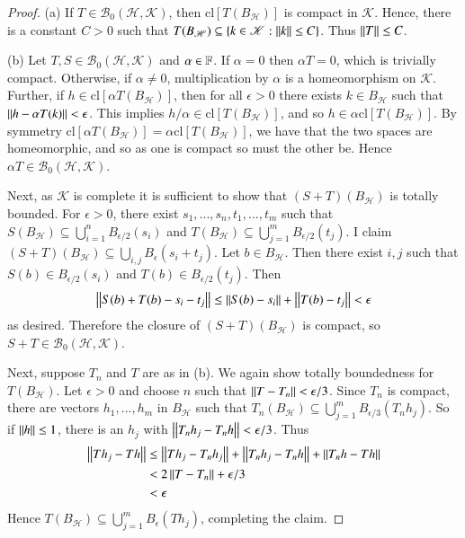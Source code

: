 \begin{proof}
    (a) If $T \in \mathscr{B}_0(\mathscr{H},\mathscr{K})$, then $\text{cl}[T(B_{\mathscr{H}})]$ is compact in $\mathscr{K}$. Hence, there is a constant $C > 0$ such that $T(B_{\mathscr{H}}) \subseteq \{k \in \mathscr{K}:\left|\left| k\right|\right| \leq C\}$. Thus $\left|\left| T\right|\right| \leq C$.

    (b) Let $T,S \in \mathscr{B}_0(\mathscr{H},\mathscr{K})$ and $\alpha \in \mathbb F$. If $\alpha = 0$ then $\alpha T = 0$, which is trivially compact. Otherwise, if $\alpha \neq 0$, multiplication by $\alpha$ is a homeomorphism on $\mathscr{K}$. Further, if $h \in \text{cl}[\alpha T(B_{\mathscr{H}})]$, then for all $\epsilon > 0$ there exists $k \in B_{\mathscr{H}}$ such that $\left|\left| h-\alpha T(k)\right|\right| < \epsilon$. This implies $h/\alpha \in \text{cl}[T(B_{\mathscr{H}})]$, and so $h \in \alpha\text{cl}[T(B_{\mathscr{H}})]$. By symmetry $\text{cl}[\alpha T(B_{\mathscr{H}})] = \alpha \text{cl}[T(B_{\mathscr{H}})]$, we have that the two spaces are homeomorphic, and so as one is compact so must the other be. Hence $\alpha T \in \mathscr{B}_0(\mathscr{H},\mathscr{K})$.

    Next, as $\mathscr{K}$ is complete it is sufficient to show that $(S+T)(B_{\mathscr{H}})$ is totally bounded. For $\epsilon > 0$, there exist $s_1,...,s_n,t_1,...,t_m$ such that $S(B_{\mathscr{H}}) \subseteq \bigcup_{i=1}^nB_{\epsilon/2}(s_i)$ and $T(B_{\mathscr{H}}) \subseteq \bigcup_{j=1}^mB_{\epsilon/2}(t_j)$. I claim $(S+T)(B_{\mathscr{H}}) \subseteq \bigcup_{i,j} B_{\epsilon}(s_i+t_j)$. Let $b \in B_{\mathscr{H}}$. Then there exist $i,j$ such that $S(b) \in B_{\epsilon/2}(s_i)$ and $T(b) \in B_{\epsilon/2}(t_j)$. Then $$\left|\left| S(b)+T(b)-s_i-t_j\right|\right| \leq \left|\left| S(b)-s_i\right|\right|+\left|\left| T(b)-t_j\right|\right| < \epsilon$$
    as desired. Therefore the closure of $(S+T)(B_{\mathscr{H}})$ is compact, so $S+T \in \mathscr{B}_0(\mathscr{H},\mathscr{K})$.

    Next, suppose $T_n$ and $T$ are as in (b). We again show totally boundedness for $T(B_{\mathscr{H}})$. Let $\epsilon > 0$ and choose $n$ such that $\left|\left| T-T_n\right|\right| < \epsilon/3$. Since $T_n$ is compact, there are vectors $h_1,...,h_m$ in $B_{\mathscr{H}}$ such that $T_n(B_{\mathscr{H}}) \subseteq \bigcup_{j=1}^m B_{\epsilon/3}(T_nh_j)$. So if $\left|\left| h\right|\right| \leq 1$, there is an $h_j$ with $\left|\left| T_nh_j-T_nh\right|\right| < \epsilon/3$. Thus \begin{align*}
        \left|\left| Th_j-Th\right|\right| &\leq \left|\left| Th_j-T_nh_j\right|\right| + \left|\left| T_nh_j-T_nh\right|\right| + \left|\left| T_nh-Th\right|\right| \\
        &<2\left|\left| T-T_n\right|\right|+\epsilon/3 \\
        &< \epsilon
    \end{align*}
    Hence $T(B_{\mathscr{H}}) \subseteq \bigcup_{j=1}^mB_{\epsilon}(Th_j)$, completing the claim.


\end{proof}
